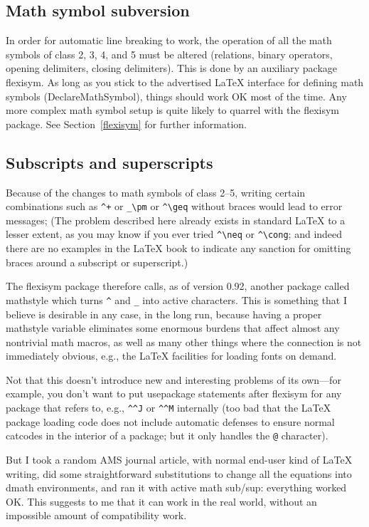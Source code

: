 \documentclass{article}
\def\latex/{{\protect\LaTeX}}
\newcommand{\ntt}{\normalfont\ttfamily}
\DeclareRobustCommand{\cs}[1]{{\ntt\ttbackslash#1}}
\let\cn=\cs
\DeclareRobustCommand{\pkg}[1]{{\ntt#1}}
\begin{document}
\subsection{Math symbol subversion}
In order for automatic line breaking to work, the operation of all the
math symbols of class 2, 3, 4, and 5 must be altered (relations, binary
operators, opening delimiters, closing delimiters). This is done by an
auxiliary package \pkg{flexisym}. As long as you stick to the advertised
\latex/ interface for defining math symbols (\cn{DeclareMathSymbol}),
things should work OK most of the time. Any more complex math symbol
setup is quite likely to quarrel with the \pkg{flexisym} package.
See Section~\ref{flexisym} for further information.

\subsection{Subscripts and superscripts}

Because of the changes to math symbols of class 2--5, writing certain
combinations such as \verb'^+' or \verb'_\pm' or \verb'^\geq' without
braces would lead to error messages; (The problem described here
already exists in standard \latex/ to a lesser extent, as you may know
if you ever tried \verb'^\neq' or \verb'^\cong'; and indeed there are
no examples in the \latex/ book to indicate any sanction for omitting
braces around a subscript or superscript.)

The \pkg{flexisym} package therefore calls, as of version 0.92, another
package called \pkg{mathstyle} which turns \verb'^' and \verb'_' into
active characters. This is something that I believe is desirable in any
case, in the long run, because having a proper mathstyle variable
eliminates some enormous burdens that affect almost any
nontrivial math macros, as well as many other things where the
connection is not immediately obvious, e.g., the \latex/ facilities for
loading fonts on demand.

Not that this doesn't introduce new and interesting problems of its
own---for example, you don't want to put usepackage statements
after flexisym for any package that refers to, e.g., \verb'^^J' or 
\verb'^^M'
internally (too bad that the \latex/ package loading code does not
include automatic defenses to ensure normal catcodes in the interior of
a package; but it only handles the \verb'@' character).

But I took a random AMS journal article, with normal end-user kind of
\latex/ writing, did some straightforward substitutions to change all
the equations into dmath environments, and ran it with active math
sub/sup: everything worked OK. This suggests to me that it can work in
the real world, without an impossible amount of compatibility work.
\end{document}
